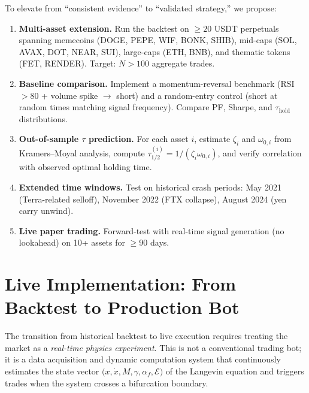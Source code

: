 \documentclass[11pt,a4paper]{article}
\newcommand{\af}{\alpha_f}
\begin{document}
To elevate from ``consistent evidence'' to ``validated strategy,'' we propose:

\begin{enumerate}[label=\textbf{V\arabic*.}]
    \item \textbf{Multi-asset extension.} Run the backtest on $\ge 20$ USDT 
    perpetuals spanning memecoins (DOGE, PEPE, WIF, BONK, SHIB), mid-caps 
    (SOL, AVAX, DOT, NEAR, SUI), large-caps (ETH, BNB), and thematic tokens 
    (FET, RENDER). Target: $N > 100$ aggregate trades.

    \item \textbf{Baseline comparison.} Implement a momentum-reversal benchmark 
    (RSI~$> 80$ + volume spike $\to$ short) and a random-entry control (short 
    at random times matching signal frequency). Compare PF, Sharpe, and 
    $\tau_{\mathrm{hold}}$ distributions.

    \item \textbf{Out-of-sample $\tau$ prediction.} For each asset $i$, 
    estimate $\zeta_i$ and $\omega_{0,i}$ from Kramers--Moyal analysis, compute 
    $\tau_{1/2}^{(i)} = 1/(\zeta_i \omega_{0,i})$, and verify correlation with 
    observed optimal holding time.

    \item \textbf{Extended time windows.} Test on historical crash periods: 
    May 2021 (Terra-related selloff), November 2022 (FTX collapse), 
    August 2024 (yen carry unwind).

    \item \textbf{Live paper trading.} Forward-test with real-time signal 
    generation (no lookahead) on 10+ assets for $\ge 90$ days.
\end{enumerate}


\section{Live Implementation: From Backtest to Production Bot}
\label{sec:implementation}

The transition from historical backtest to live execution requires treating the 
market as a \emph{real-time physics experiment}. This is not a conventional 
trading bot; it is a data acquisition and dynamic computation system that 
continuously estimates the state vector $\bigl(x, \dot{x}, M, \gamma, 
\af, \mathcal{E}\bigr)$ of the Langevin equation and triggers trades when 
the system crosses a bifurcation boundary.
\end{document}
